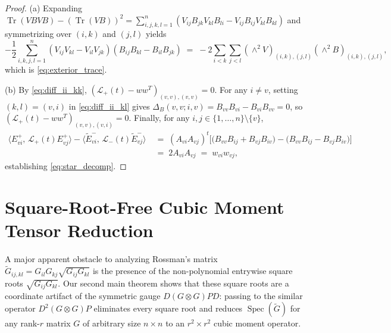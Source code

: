\documentclass[11pt,a4paper]{article}
\theoremstyle{plain}
\theoremstyle{definition}
\theoremstyle{remark}
\DeclareMathOperator{\Tr}{Tr}
\DeclareMathOperator{\Spec}{Spec}
\begin{document}
\begin{proof}
(a) Expanding $\Tr(VBVB) - (\Tr(VB))^2 = \sum_{i,j,k,l=1}^n (V_{ij}B_{jk}V_{kl}B_{li} - V_{ij}B_{ij}V_{kl}B_{kl})$ and symmetrizing over $(i,k)$ and $(j,l)$ yields
\[
  -\frac{1}{2}\sum_{i,k,j,l=1}^n (V_{ij}V_{kl} - V_{il}V_{jk})(B_{ij}B_{kl} - B_{il}B_{jk}) \;=\; -2 \sum_{i < k} \sum_{j < l} (\wedge^2 V)_{(i,k),(j,l)} (\wedge^2 B)_{(i,k),(j,l)},
\]
which is \eqref{eq:exterior_trace}.

(b) By \eqref{eq:diff_ii_kk}, $(\mathcal{L}_+(t) - w w^T)_{(v,v),(v,v)} = 0$. For any $i \ne v$, setting $(k,l) = (v,i)$ in \eqref{eq:diff_ii_kl} gives $\Delta_B(v,v;i,v) = B_{vv}B_{vi} - B_{vi}B_{vv} = 0$, so $(\mathcal{L}_+(t) - w w^T)_{(v,v),(v,i)} = 0$. Finally, for any $i, j \in \{1,\dots,n\} \setminus \{v\}$,
\begin{align*}
  \big\langle E_{vi}^+, \, \mathcal{L}_+(t) E_{vj}^+ \big\rangle - \big\langle \widetilde{E}_{vi}^-, \, \mathcal{L}_-(t) \widetilde{E}_{vj}^- \big\rangle &\;=\; (A_{vi}A_{vj})^t\Big[\big(B_{vv}B_{ij} + B_{vj}B_{iv}\big) - \big(B_{vv}B_{ij} - B_{vj}B_{iv}\big)\Big] \\
  &\;=\; 2 A_{vi} A_{vj} \;=\; w_{vi} w_{vj},
\end{align*}
establishing \eqref{eq:star_decomp}.
\end{proof}

\section{Square-Root-Free Cubic Moment Tensor Reduction}\label{sec:cubic}

A major apparent obstacle to analyzing Rossman's matrix $\widetilde{G}_{ij,kl} = G_{il}G_{kj}\sqrt{G_{ij}G_{kl}}$ is the presence of the non-polynomial entrywise square roots $\sqrt{G_{ij}G_{kl}}$. Our second main theorem shows that these square roots are a coordinate artifact of the symmetric gauge $D(G \otimes G)PD$: passing to the similar operator $D^2(G \otimes G)P$ eliminates every square root and reduces $\Spec(\widetilde{G})$ for any rank-$r$ matrix $G$ of arbitrary size $n \times n$ to an $r^2 \times r^2$ cubic moment operator.
\end{document}
